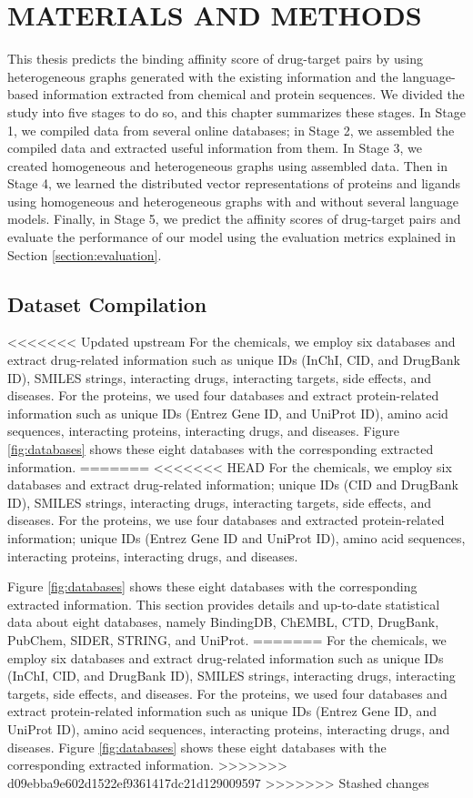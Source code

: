 \chapter{MATERIALS AND METHODS}
This thesis predicts the binding affinity score of drug-target pairs by using heterogeneous graphs generated with the existing information and the language-based information extracted from chemical and protein sequences. We divided the study into five stages to do so, and this chapter summarizes these stages. In Stage 1, we compiled data from several online databases; in Stage 2, we assembled the compiled data and extracted useful information from them. In Stage 3, we created homogeneous and heterogeneous graphs using assembled data. Then in Stage 4, we learned the distributed vector representations of proteins and ligands using homogeneous and heterogeneous graphs with and without several language models. Finally, in Stage 5, we predict the affinity scores of drug-target pairs and evaluate the performance of our model using the evaluation metrics explained in Section \ref{section:evaluation}. 

\section{Dataset Compilation}
<<<<<<< Updated upstream
For the chemicals, we employ six databases and extract drug-related information such as unique IDs (InChI, CID, and DrugBank ID), SMILES strings, interacting drugs, interacting targets, side effects, and diseases. For the proteins, we used four databases and extract protein-related information such as unique IDs (Entrez Gene ID, and UniProt ID), amino acid sequences, interacting proteins, interacting drugs, and diseases. Figure \ref{fig:databases} shows these eight databases with the corresponding extracted information. 
=======
<<<<<<< HEAD
\label{section:dataset_compilation}
For the chemicals, we employ six databases and extract drug-related information; unique IDs (CID and DrugBank ID), SMILES strings, interacting drugs, interacting targets, side effects, and diseases. For the proteins, we use four databases and extracted protein-related information; unique IDs (Entrez Gene ID and UniProt ID), amino acid sequences, interacting proteins, interacting drugs, and diseases. 

Figure \ref{fig:databases} shows these eight databases with the corresponding extracted information. This section provides details and up-to-date statistical data about eight databases, namely BindingDB, ChEMBL, CTD, DrugBank, PubChem, SIDER, STRING, and UniProt.
=======
For the chemicals, we employ six databases and extract drug-related information such as unique IDs (InChI, CID, and DrugBank ID), SMILES strings, interacting drugs, interacting targets, side effects, and diseases. For the proteins, we used four databases and extract protein-related information such as unique IDs (Entrez Gene ID, and UniProt ID), amino acid sequences, interacting proteins, interacting drugs, and diseases. Figure \ref{fig:databases} shows these eight databases with the corresponding extracted information. 
>>>>>>> d09ebba9e602d1522ef9361417dc21d129009597
>>>>>>> Stashed changes

